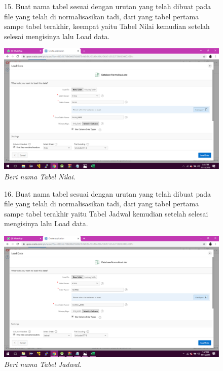 \begin{enumerate}
\begin{figure}
\item[15.]Buat nama tabel sesuai dengan urutan yang telah dibuat pada file yang telah di normalisasikan tadi, dari yang tabel pertama sampe tabel terakhir, keempat yaitu Tabel Nilai kemudian setelah selesai mengisinya lalu Load data.    
    \begin{center}
    \includegraphics[scale=0.3]{figures/16.png}
    \caption{\textit{Beri nama Tabel Nilai.}}
    \end{center}
    \label{gambar}
    \end{figure}


\begin{figure}
\item[16.]Buat nama tabel sesuai dengan urutan yang telah dibuat pada file yang telah di normalisasikan tadi, dari yang tabel pertama sampe tabel terakhir yaitu Tabel Jadwal kemudian setelah selesai mengisinya lalu Load data. 
    \begin{center}
    \includegraphics[scale=0.3]{figures/19.png}
    \caption{\textit{Beri nama Tabel Jadwal.}}
    \end{center}
    \label{gambar}
    \end{figure}


\end{enumerate}
